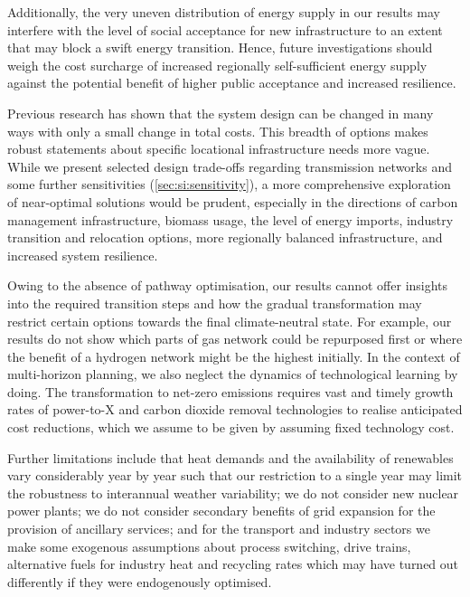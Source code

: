 Additionally, the very uneven distribution of energy supply in our results may
interfere with the level of social acceptance for new infrastructure to an
extent that may block a swift energy transition.
\cite{sasseDistributionalTradeoffs2019,sasseRegionalImpacts2020} Hence, future
investigations should weigh the cost surcharge of increased regionally
self-sufficient energy supply against the potential benefit of higher public
acceptance and increased resilience.

Previous research has shown that the system design can be changed in many ways
with only a small change in total
costs.\cite{Neumann2019,lombardiPolicyDecision2020,pedersenModelingAll2021,pickeringDiversityOptions2022}
This breadth of options makes robust statements about specific locational
infrastructure needs more vague. While we present selected design trade-offs
regarding transmission networks and some further sensitivities
(\cref{sec:si:sensitivity}), a more comprehensive exploration of near-optimal
solutions would be prudent, especially in the directions of carbon management
infrastructure, biomass usage, the level of energy imports, industry transition
and relocation options, more regionally balanced infrastructure, and increased
system resilience.

Owing to the absence of pathway optimisation, our results
cannot offer insights into the required transition steps and how the
gradual transformation may restrict certain options towards the final
climate-neutral state. For example, our results do not show which parts of gas
network could be repurposed first or where the benefit of a hydrogen network
might be the highest initially. In the context of multi-horizon planning, we
also neglect the dynamics of technological learning by
doing.\cite{heubergerPowerCapacity2017,fellingMultihorizonPlanning2022,zeyenEndogenousLearning2022}
The transformation to net-zero emissions requires vast and timely growth rates
of power-to-X\cite{odenwellerProbabilisticFeasibility2022} and carbon dioxide
removal technologies to realise anticipated cost reductions, which we assume to
be given by assuming fixed technology cost.

Further limitations include that heat demands and the availability of renewables
vary considerably year by year such that our restriction to a single year may
limit the robustness to interannual weather variability; we do not consider new
nuclear power plants; we do not consider secondary benefits of grid expansion
for the provision of ancillary services; and for the transport and industry
sectors we make some exogenous assumptions about process switching, drive
trains, alternative fuels for industry heat and recycling rates which may have
turned out differently if they were endogenously optimised.

